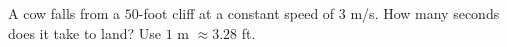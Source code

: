 A cow falls from a $50$-foot cliff at a constant speed of $3$ m/s. How many seconds does it take to land? Use $1$ m $\approx3.28$ ft.
